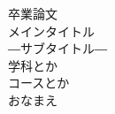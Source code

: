 
\begin{titlepage}

\begin{center}
\vspace*{80truept}
{\huge 卒業論文}\\
\vspace{60truept}
{\huge メインタイトル}\\
\vspace{20truept}
{\LARGE ―サブタイトル―}\\
\vspace{250truept}
{\LARGE 学科とか}\\
\vspace{10truept}
{\LARGE コースとか}\\
\vspace{20truept}
{\huge おなまえ}\\
\end{center}

\end{titlepage}